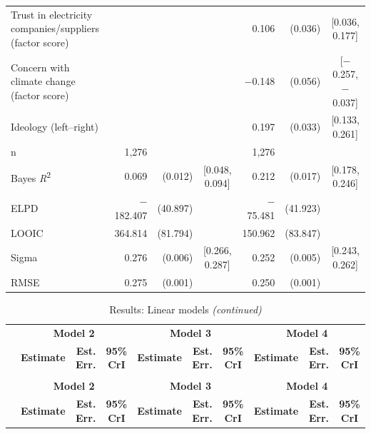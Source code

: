 \begin{landscape}
\begin{longtable}[t]{>{\raggedright\arraybackslash}p{2.8in}rrcrrc}
Trust in electricity companies/suppliers (factor score) &  &  &  & 0.106 & (0.036) & {}[0.036, 0.177]\\
Concern with climate change (factor score) &  &  &  & $-$0.148 & (0.056) & {}[$-$0.257, $-$0.037]\\
Ideology (left--right) &  &  &  & 0.197 & (0.033) & {}[0.133, 0.261]\\
\midrule
n & 1,276 &  &  & 1,276 &  & \\
Bayes \textit{R}\textsuperscript{2} & 0.069 & (0.012) & {}[0.048, 0.094] & 0.212 & (0.017) & {}[0.178, 0.246]\\
ELPD & $-$182.407 & (40.897) &  & $-$75.481 & (41.923) & \\
LOOIC & 364.814 & (81.794) &  & 150.962 & (83.847) & \\
Sigma & 0.276 & (0.006) & {}[0.266, 0.287] & 0.252 & (0.005) & {}[0.243, 0.262]\\
RMSE & 0.275 & (0.001) &  & 0.250 & (0.001) & \\*
\end{longtable}

\newpage
\addtocounter{table}{-1}

\begin{longtable}[t]{>{\raggedright\arraybackslash}p{2.8in}rrcrrcrrc}
\caption{Results: Linear models \textit{(continued)}}\\
\toprule
\multicolumn{1}{c}{ } & \multicolumn{3}{c}{\textbf{Model 2}} & \multicolumn{3}{c}{\textbf{Model 3}} & \multicolumn{3}{c}{\textbf{Model 4}} \\
\cmidrule(l{3pt}r{3pt}){2-4} \cmidrule(l{3pt}r{3pt}){5-7} \cmidrule(l{3pt}r{3pt}){8-10}
 & \textbf{Estimate} & \textbf{Est. Err.} & \textbf{95\% CrI} & \textbf{Estimate} & \textbf{Est. Err.} & \textbf{95\% CrI} & \textbf{Estimate} & \textbf{Est. Err.} & \textbf{95\% CrI}\\
\midrule
\endfirsthead
\caption[]{Results: Linear models \textit{(continued)}}\\
\toprule
\multicolumn{1}{c}{ } & \multicolumn{3}{c}{\textbf{Model 2}} & \multicolumn{3}{c}{\textbf{Model 3}} & \multicolumn{3}{c}{\textbf{Model 4}} \\
\cmidrule(l{3pt}r{3pt}){2-4} \cmidrule(l{3pt}r{3pt}){5-7} \cmidrule(l{3pt}r{3pt}){8-10}
 & \textbf{Estimate} & \textbf{Est. Err.} & \textbf{95\% CrI} & \textbf{Estimate} & \textbf{Est. Err.} & \textbf{95\% CrI} & \textbf{Estimate} & \textbf{Est. Err.} & \textbf{95\% CrI}\\
\midrule
\endhead


\end{longtable}
\end{landscape}
